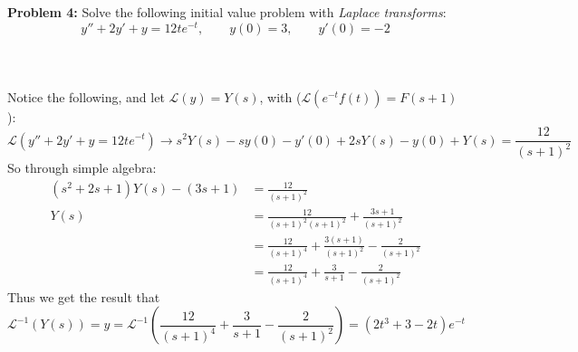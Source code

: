 \documentclass[12pt]{article}
\begin{document}
\newpage

\noindent \textbf{Problem 4: }Solve the following initial value problem with \textit{Laplace transforms}:
	$$
	y'' + 2y' + y = 12te^{-t}, \qquad y(0) = 3, \qquad y'(0) = -2
	$$
\\ \\ \\
Notice the following, and let $\mathcal{L}(y) = Y(s)$, with ($\mathcal{L}(e^{-t}f(t)) = F(s+1)$):
	$$
	\mathcal{L}\left(y'' + 2y' + y = 12te^{-t}\right) \rightarrow s^2Y(s) - sy(0) - y'(0) + 2sY(s) - y(0) + Y(s) = \frac{12}{(s+1)^2}
	$$
So through simple algebra:
	\begin{align*}
		(s^2 + 2s + 1)Y(s) - (3s + 1) &= \frac{12}{(s+1)^2} \\
		Y(s) &= \frac{12}{(s+1)^2(s+1)^2} + \frac{3s + 1}{(s+1)^2} \\
		&= \frac{12}{(s+1)^4} + \frac{3(s + 1)}{(s+1)^2} - \frac{2}{(s+1)^2} \\
		&= \frac{12}{(s+1)^4} + \frac{3}{s+1} - \frac{2}{(s+1)^2}
	\end{align*}
Thus we get the result that
	$$
	\mathcal{L}^{-1}(Y(s)) = y = \mathcal{L}^{-1}\left(\frac{12}{(s+1)^4} + \frac{3}{s+1} - \frac{2}{(s+1)^2}\right) = (2t^3 + 3- 2t)e^{-t}
	$$
	
	
	
	
	
	
	
	
	
	
	
	
	
	
	
	
	
	
	
	
	
	
	
	
	
	
	
	
	
	
	
	
	
	
\end{document}
